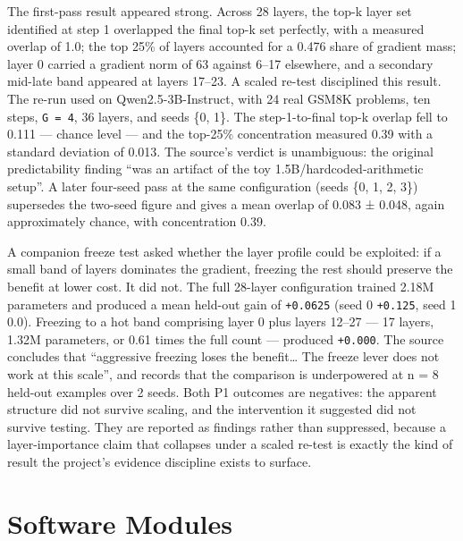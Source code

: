 \documentclass[12pt,a4paper]{report}
\DeclareRobustCommand{\longtok}[1]{\texttt{\seqsplit{#1}}}
\begin{document}
The first-pass result appeared strong. Across 28 layers, the top-k layer
set identified at step 1 overlapped the final top-k set perfectly, with
a measured overlap of 1.0; the top 25\% of layers accounted for a 0.476
share of gradient mass; layer 0 carried a gradient norm of 63 against
6--17 elsewhere, and a secondary mid-late band appeared at layers
17--23. A scaled re-test disciplined this result. The re-run used
\longtok{p1\_\allowbreak{}layer\_\allowbreak{}profile\_\allowbreak{}scaled.py} on Qwen2.5-3B-Instruct, with 24
real GSM8K problems, ten steps, \texttt{G\ =\ 4}, 36 layers, and seeds
\{0, 1\}. The step-1-to-final top-k overlap fell to 0.111 --- chance
level --- and the top-25\% concentration measured 0.39 with a standard
deviation of 0.013. The source's verdict is unambiguous: the original
predictability finding ``was an artifact of the toy
1.5B/hardcoded-arithmetic setup''. A later four-seed pass at the same
configuration (seeds \{0, 1, 2, 3\}) supersedes the two-seed figure and
gives a mean overlap of 0.083 ± 0.048, again approximately chance, with
concentration 0.39.

A companion freeze test asked whether the layer profile could be
exploited: if a small band of layers dominates the gradient, freezing
the rest should preserve the benefit at lower cost. It did not. The full
28-layer configuration trained 2.18M parameters and produced a mean
held-out gain of \texttt{+0.0625} (seed 0 \texttt{+0.125}, seed 1 0.0).
Freezing to a hot band comprising layer 0 plus layers 12--27 --- 17
layers, 1.32M parameters, or 0.61 times the full count --- produced
\texttt{+0.000}. The source concludes that ``aggressive freezing loses
the benefit\ldots{} The freeze lever does not work at this scale'', and
records that the comparison is underpowered at n = 8 held-out examples
over 2 seeds. Both P1 outcomes are negatives: the apparent structure did
not survive scaling, and the intervention it suggested did not survive
testing. They are reported as findings rather than suppressed, because a
layer-importance claim that collapses under a scaled re-test is exactly
the kind of result the project's evidence discipline exists to surface.

\section{Software Modules}\label{software-modules}
\end{document}
